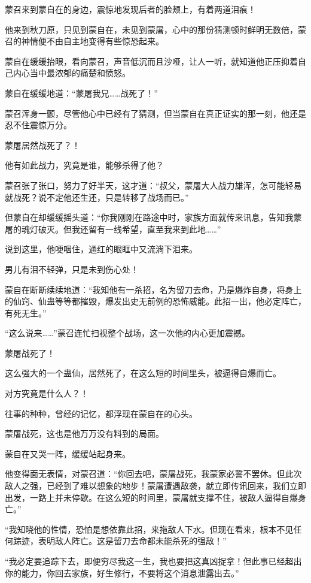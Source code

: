 \begin{this_body}
蒙召来到蒙自在的身边，震惊地发现后者的脸颊上，有着两道泪痕！

他来到秋刀原，只见到蒙自在，未见到蒙屠，心中的那份猜测顿时鲜明无数倍，蒙召的神情便不由自主地变得有些惊恐起来。

蒙自在缓缓抬眼，看向蒙召，声音低沉而且沙哑，让人一听，就知道他正压抑着自己内心当中最浓郁的痛楚和愤怒。

蒙自在缓缓地道：“蒙屠我兄……战死了！”

蒙召浑身一颤，尽管他心中已经有了猜测，但当蒙自在真正证实的那一刻，他还是忍不住震惊万分。

蒙屠居然战死了？！

他有如此战力，究竟是谁，能够杀得了他？

蒙召张了张口，努力了好半天，这才道：“叔父，蒙屠大人战力雄浑，怎可能轻易就战死？说不定他还生还，只是转移了战场而已。”

但蒙自在却缓缓摇头道：“你我刚刚在路途中时，家族方面就传来讯息，告知我蒙屠的魂灯破灭。但我还留有一线希望，直至我来到此地……”

说到这里，他哽咽住，通红的眼眶中又流淌下泪来。

男儿有泪不轻弹，只是未到伤心处！

蒙自在断断续续地道：“我知他有一杀招，名为留刀去命，乃是爆炸自身，将身上的仙窍、仙蛊等等都摧毁，爆发出史无前例的恐怖威能。此招一出，他必定阵亡，有死无生。”

“这么说来……”蒙召连忙扫视整个战场，这一次他的内心更加震撼。

蒙屠战死了！

这么强大的一个蛊仙，居然死了，在这么短的时间里头，被逼得自爆而亡。

对方究竟是什么人？！

往事的种种，曾经的记忆，都浮现在蒙自在的心头。

蒙屠战死，这也是他万万没有料到的局面。

蒙自在又哭一阵，缓缓站起身来。

他变得面无表情，对蒙召道：“你回去吧，蒙屠战死，我蒙家必誓不罢休。但此次敌人之强，已经到了难以想象的地步！蒙屠遭遇敌袭，就立即传讯回来，我们立即出发，一路上并未停歇。在这么短的时间里，蒙屠就支撑不住，被敌人逼得自爆身亡。”

“我知晓他的性情，恐怕是想依靠此招，来拖敌人下水。但现在看来，根本不见任何踪迹，表明敌人阵亡。这是留刀去命都未能杀死的强敌！”

“我必定要追踪下去，即便穷尽我这一生，我也要把这真凶捉拿！但此事已经超出你的能力，你回去家族，好生修行，不要将这个消息泄露出去。”


\end{this_body}
